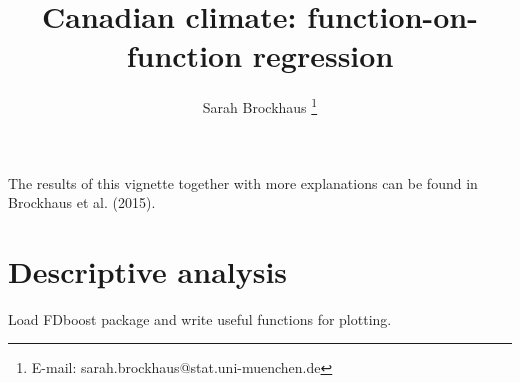 \documentclass{article}\usepackage[]{graphicx}\usepackage[]{color}
\begin{document}

\title{Canadian climate: function-on-function regression}
\author{Sarah Brockhaus 
\thanks{E-mail: sarah.brockhaus@stat.uni-muenchen.de}}
\date{}
\maketitle

The results of this vignette together with more explanations can be found in Brockhaus et al. (2015). 



\section{Descriptive analysis}

Load FDboost package and write useful functions for plotting.
\end{document}
